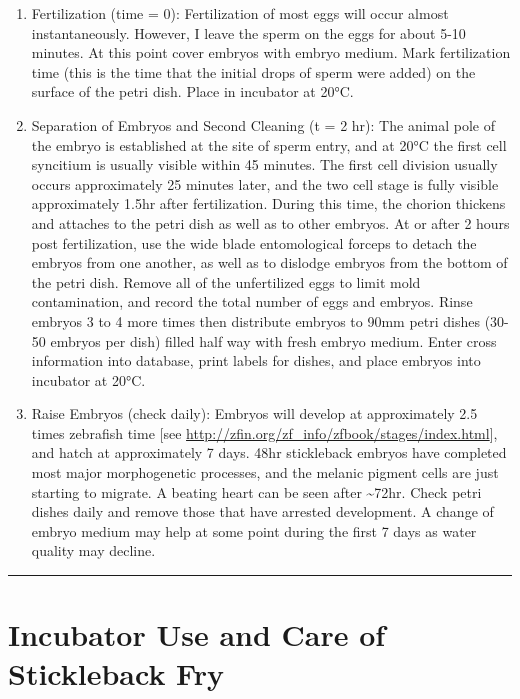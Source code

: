 \documentclass[
]{book}
\begin{document}
\begin{enumerate}
\item
  Fertilization (time = 0): Fertilization of most eggs will occur almost instantaneously. However, I leave the sperm on the eggs for about 5-10 minutes. At this point cover embryos with embryo medium. Mark fertilization time (this is the time that the initial drops of sperm were added) on the surface of the petri dish. Place in incubator at 20°C.
\item
  Separation of Embryos and Second Cleaning (t = 2 hr): The animal pole of the embryo is established at the site of sperm entry, and at 20°C the first cell syncitium is usually visible within 45 minutes. The first cell division usually occurs approximately 25 minutes later, and the two cell stage is fully visible approximately 1.5hr after fertilization. During this time, the chorion thickens and attaches to the petri dish as well as to other embryos. At or after 2 hours post fertilization, use the wide blade entomological forceps to detach the embryos from one another, as well as to dislodge embryos from the bottom of the petri dish. Remove all of the unfertilized eggs to limit mold contamination, and record the total number of eggs and embryos. Rinse embryos 3 to 4 more times then distribute embryos to 90mm petri dishes (30-50 embryos per dish) filled half way with fresh embryo medium. Enter cross information into database, print labels for dishes, and place embryos into incubator at 20°C.
\item
  Raise Embryos (check daily): Embryos will develop at approximately 2.5 times zebrafish time {[}see \url{http://zfin.org/zf_info/zfbook/stages/index.html}{]}, and hatch at approximately 7 days. 48hr stickleback embryos have completed most major morphogenetic processes, and the melanic pigment cells are just starting to migrate. A beating heart can be seen after \textasciitilde72hr. Check petri dishes daily and remove those that have arrested development. A change of embryo medium may help at some point during the first 7 days as water quality may decline.
\end{enumerate}

\begin{center}\rule{0.5\linewidth}{0.5pt}\end{center}

\hypertarget{incubator-use-and-care-of-stickleback-fry}{%
\section{Incubator Use and Care of Stickleback Fry}\label{incubator-use-and-care-of-stickleback-fry}}
\end{document}
